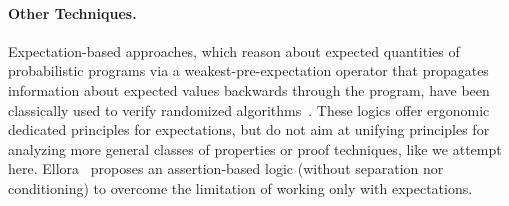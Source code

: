\paragraph{\bfseries Other Techniques.}
Expectation-based approaches, which reason about expected quantities of probabilistic programs via a weakest-pre-expectation operator that propagates information about expected values backwards through the program, have been classically used to verify randomized algorithms~\cite{kozen1983PDL,Morgan:1996,kaminski2016weakest,kaminski2019thesis,aguirre2021pre,Bartocci2022moment}.
These logics offer ergonomic dedicated principles for expectations, but do not aim at unifying principles for analyzing more general classes of properties or proof techniques, like we attempt here.
Ellora~\cite{barthe2016ellora} proposes an assertion-based logic (without separation nor conditioning) to overcome the limitation of working only with expectations.
